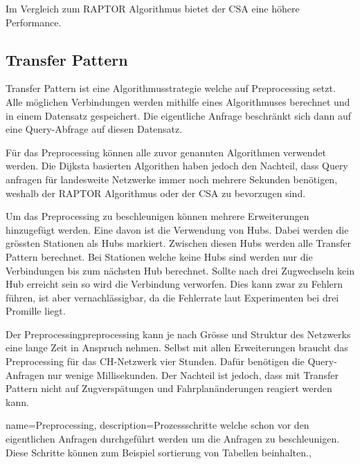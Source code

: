 Im Vergleich zum RAPTOR Algorithmus bietet der CSA eine höhere Performance. ~\cite{csa}


\subsection{Transfer Pattern}
\label{sec:Transfer Pattern}
Transfer Pattern ist eine Algorithmusstrategie welche auf Preprocessing setzt. Alle möglichen Verbindungen werden mithilfe eines Algorithmuses berechnet und in einem Datensatz gespeichert. Die eigentliche Anfrage beschränkt sich dann auf eine Query-Abfrage auf diesen Datensatz.

Für das Preprocessing können alle zuvor genannten Algorithmen verwendet werden. Die Dijksta basierten Algorithen haben jedoch den Nachteil, dass Query anfragen für landesweite Netzwerke immer noch mehrere Sekunden benötigen, weshalb der RAPTOR Algorithmus oder der CSA zu bevorzugen sind. ~\cite{transferpatterns_alenex}

Um das Preprocessing zu beschleunigen können mehrere Erweiterungen hinzugefügt werden. Eine davon ist die Verwendung von Hubs. Dabei werden die grössten Stationen als Hubs markiert. Zwischen diesen Hubs werden alle Transfer Pattern berechnet. Bei Stationen welche keine Hubs sind werden nur die Verbindungen bis zum nächsten Hub berechnet. Sollte nach drei Zugwechseln kein Hub erreicht sein so wird die Verbindung verworfen. Dies kann zwar zu Fehlern führen, ist aber vernachlässigbar, da die Fehlerrate laut Experimenten bei drei Promille liegt. ~\cite{transferpatterns_esa}

Der Preprocessing\gls{preprocessing} kann je nach Grösse und Struktur des Netzwerks eine lange Zeit in Anspruch nehmen. Selbst mit allen Erweiterungen braucht das Preprocessing für das CH-Netzwerk vier Stunden. Dafür benötigen die Query-Anfragen nur wenige Millisekunden. Der Nachteil ist jedoch, dass mit Transfer Pattern nicht auf Zugverspätungen und Fahrplanänderungen reagiert werden kann. 

{
	name={Preprocessing},
	description={Prozessschritte welche schon vor den eigentlichen Anfragen durchgeführt werden um die Anfragen zu beschleunigen. Diese Schritte können zum Beispiel sortierung von Tabellen beinhalten.},
}



